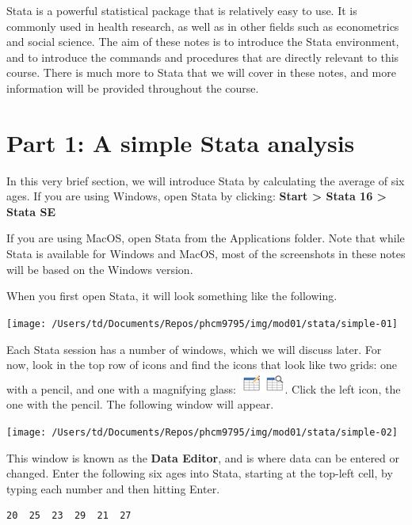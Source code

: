 \documentclass[
]{memoir}
\begin{document}
Stata is a powerful statistical package that is relatively easy to use. It is commonly used in health research, as well as in other fields such as econometrics and social science. The aim of these notes is to introduce the Stata environment, and to introduce the commands and procedures that are directly relevant to this course. There is much more to Stata that we will cover in these notes, and more information will be provided throughout the course.

\hypertarget{part-1-a-simple-stata-analysis}{%
\section*{Part 1: A simple Stata analysis}\label{part-1-a-simple-stata-analysis}}

In this very brief section, we will introduce Stata by calculating the average of six ages. If you are using Windows, open Stata by clicking: \textbf{Start \textgreater{} Stata 16 \textgreater{} Stata SE}

If you are using MacOS, open Stata from the Applications folder. Note that while Stata is available for Windows and MacOS, most of the screenshots in these notes will be based on the Windows version.

When you first open Stata, it will look something like the following.

\texttt{[image: /Users/td/Documents/Repos/phcm9795/img/mod01/stata/simple-01]}

Each Stata session has a number of windows, which we will discuss later. For now, look in the top row of icons and find the icons that look like two grids: one with a pencil, and one with a magnifying glass: \includegraphics{img/mod01/stata/data-browser-icons.png}. Click the left icon, the one with the pencil. The following window will appear.

\texttt{[image: /Users/td/Documents/Repos/phcm9795/img/mod01/stata/simple-02]}

This window is known as the \textbf{Data Editor}, and is where data can be entered or changed. Enter the following six ages into Stata, starting at the top-left cell, by typing each number and then hitting Enter.

\begin{verbatim}
20  25  23  29  21  27
\end{verbatim}
\end{document}
